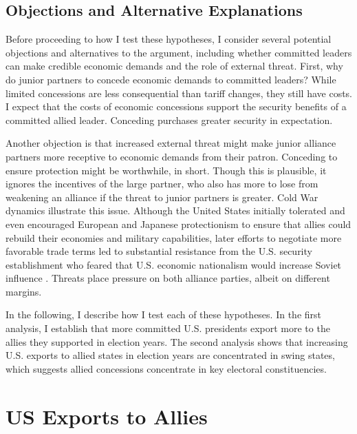 \documentclass[12pt]{article}
\begin{document}
\subsection{Objections and Alternative Explanations}


Before proceeding to how I test these hypotheses, I consider several potential objections and alternatives to the argument, including whether committed leaders can make credible economic demands and the role of external threat.
First, why do junior partners to concede economic demands to committed leaders? 
While limited concessions are less consequential than tariff changes, they still have costs.
I expect that the costs of economic concessions support the security benefits of a committed allied leader. 
Conceding purchases greater security in expectation. 


Another objection is that increased external threat might make junior alliance partners more receptive to economic demands from their patron.
Conceding to ensure protection might be worthwhile, in short.
Though this is plausible, it ignores the incentives of the large partner, who also has more to lose from weakening an alliance if the threat to junior partners is greater. 
Cold War dynamics illustrate this issue.
Although the United States initially tolerated and even encouraged European and Japanese protectionism to ensure that allies could rebuild their economies and military capabilities, later efforts to negotiate more favorable trade terms led to substantial resistance from the U.S. security establishment who feared that U.S. economic nationalism would increase Soviet influence \citep{Mastanduno1998}.
Threats place pressure on both alliance parties, albeit on different margins.


In the following, I describe how I test each of these hypotheses. 
In the first analysis, I establish that more committed U.S. presidents export more to the allies they supported in election years. 
The second analysis shows that increasing U.S. exports to allied states in election years are concentrated in swing states, which suggests allied concessions concentrate in key electoral constituencies.



\section{US Exports to Allies}
\end{document}
